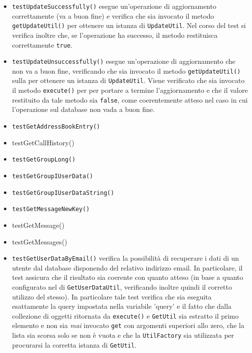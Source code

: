 \begin{itemize}
\begin{itemize}
\item \texttt{testUpdateSuccessfully()} esegue un'operazione di aggiornamento correttamente (va a buon fine) e verifica che sia invocato il metodo \texttt{getUpdateUtil()} per ottenere un istanza di \texttt{UpdateUtil}. Nel corso del test si verifica inoltre che, se l'operazione ha successo, il metodo restituisca correttamente \texttt{true}.

\item \texttt{testUpdateUnsuccessfully()} esegue un'operazione di aggiornamento che non va a buon fine, verificando che sia invocato il metodo \texttt{getUpdateUtil()} sulla  per ottenere un istanza di \texttt{UpdateUtil}. Viene verificato che sia invocato il metodo \texttt{execute()} per per portare a termine l'aggiornamento e che il valore restituito da tale metodo sia \texttt{false}, come coerentemente atteso nel caso in cui l'operazione sul database non vada a buon fine.

\item \texttt{testGetAddressBookEntry()} 

\item \texttt{}testGetCallHistory()

\item \texttt{testGetGroupLong()} 

\item \texttt{testGetGroupIUserData()}

\item \texttt{testGetGroupIUserDataString()}

\item \texttt{testGetMessageNewKey()} 

\item \texttt{}testGetMessage()

\item \texttt{}testGetMessages()

\item \texttt{testGetUserDataByEmail()} verifica la possibilità di recuperare i dati di un utente dal database disponendo del relativo indirizzo email. In particolare, il test assicura che il risultato sia coerente con quanto atteso (in base a quanto configurato nel \underline{} di \texttt{GetUserDataUtil}, verificando inoltre quindi il corretto utilizzo del  stesso). In particolare tale test verifica che sia eseguita esattamente la query impostata nella variabile 'query' e il fatto che dalla collezione di oggetti ritornata da \texttt{execute()} e \texttt{GetUtil} sia estratto il primo elemento e non sia \textit{mai} invocato \texttt{get} con argomenti superiori allo zero, che la lista sia scorsa solo se non è vuota e che la \texttt{UtilFactory} sia utilizzata per procurarsi la corretta istanza di \texttt{GetUtil}.


\end{itemize}
\end{itemize}
